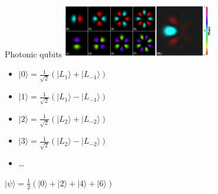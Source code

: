 \documentclass[aspectratio=169,9pt]{beamer}
\begin{document}
\begin{frame}[t]{Photonic qubits}
  \includegraphics[width=0.5\textwidth]{4photon_qubit_superposition.png}
  \begin{itemize}
    \item $|0\rangle= \frac{1}{\sqrt{2}}(|L_1\rangle + |L_{-1}\rangle)$
    \item $|1\rangle= \frac{1}{\sqrt{2}}(|L_1\rangle - |L_{-1}\rangle)$
    \item $|2\rangle= \frac{1}{\sqrt{2}}(|L_2\rangle + |L_{-2}\rangle)$
    \item $|3\rangle= \frac{1}{\sqrt{2}}(|L_2\rangle - |L_{-2}\rangle)$
    \item \ldots
  \end{itemize}
  $|\psi\rangle = \frac{1}{{2}}(|0\rangle+|2\rangle+|4\rangle+|6\rangle)$\\
\end{frame}


\end{document}
